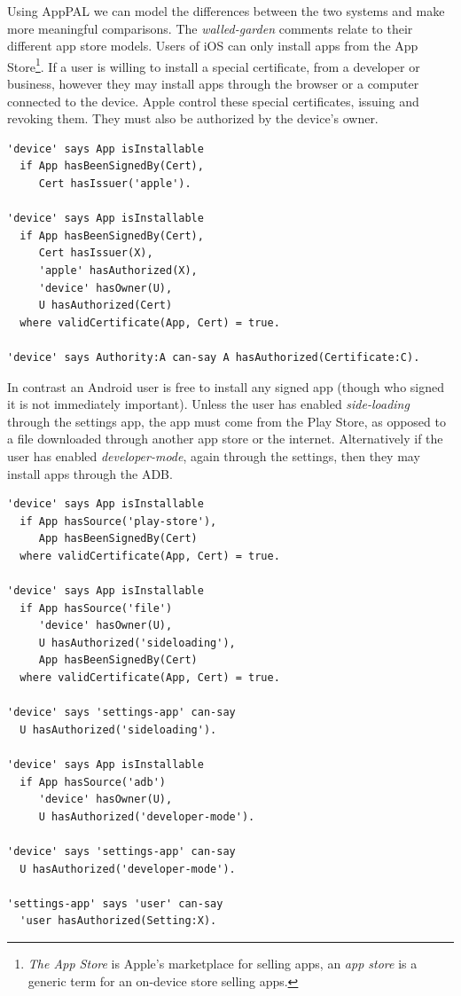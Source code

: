 \documentclass[thesis.tex]{subfiles}
\begin{document}
Using AppPAL we can model the differences between the two systems and make more
meaningful comparisons. The \emph{walled-garden} comments relate to their
different app store models. Users of iOS can only install apps from the App
Store\footnote{\emph{The App Store} is Apple's marketplace for selling apps, an
\emph{app store} is a generic term for an on-device store selling apps.}. If a
user is willing to install a special certificate, from a developer or business,
however they may install apps through the browser or a computer connected to the
device. Apple control these special certificates, issuing and revoking them.
They must also be authorized by the device's owner.
\begin{lstlisting}
'device' says App isInstallable
  if App hasBeenSignedBy(Cert),
     Cert hasIssuer('apple').

'device' says App isInstallable
  if App hasBeenSignedBy(Cert),
     Cert hasIssuer(X),
     'apple' hasAuthorized(X),
     'device' hasOwner(U),
     U hasAuthorized(Cert)
  where validCertificate(App, Cert) = true.

'device' says Authority:A can-say A hasAuthorized(Certificate:C).
\end{lstlisting}
In contrast an Android user is free to install any signed app (though who signed it is not immediately important).
Unless the user has enabled \emph{side-loading} through the settings app, the app must come from the Play Store, as opposed to a file downloaded through another app store or the internet.
Alternatively if the user has enabled \emph{developer-mode}, again through the settings, then they may install apps through the \ac{ADB}.
\begin{lstlisting}
'device' says App isInstallable
  if App hasSource('play-store'),
     App hasBeenSignedBy(Cert)
  where validCertificate(App, Cert) = true.

'device' says App isInstallable
  if App hasSource('file')
     'device' hasOwner(U),
     U hasAuthorized('sideloading'),
     App hasBeenSignedBy(Cert)
  where validCertificate(App, Cert) = true.

'device' says 'settings-app' can-say
  U hasAuthorized('sideloading').

'device' says App isInstallable
  if App hasSource('adb')
     'device' hasOwner(U),
     U hasAuthorized('developer-mode').

'device' says 'settings-app' can-say
  U hasAuthorized('developer-mode').

'settings-app' says 'user' can-say
  'user hasAuthorized(Setting:X).
\end{lstlisting}
\end{document}
